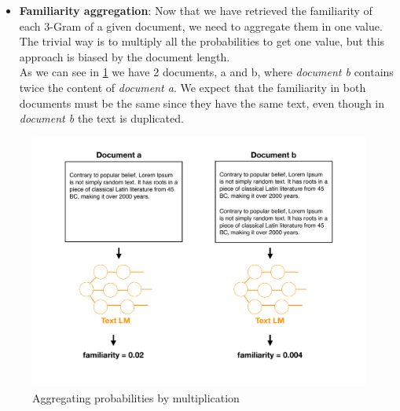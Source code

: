 \documentclass[12pt,mscthesis]{usiinfthesis}
\begin{document}
\begin{itemize}
	
		\item \textbf{Familiarity aggregation}: Now that we have retrieved the familiarity of each 3-Gram of a given document, we need to aggregate them in one value. The trivial way is to multiply all the probabilities to get one value, but this approach is biased by the document length.\\
		As we can see in \cref{aggregation-by-multiplication} we have 2 documents, a and b, where \emph{document b} contains twice the content of \emph{document a}. We expect that the familiarity in both documents must be the same since they have the same text, even though in \emph{document b} the text is duplicated.\\ 
			\end{itemize}
		\begin{figure}[H]
			\centering
			\includegraphics[width=\textwidth]{aggregation-by-multiplication}
			\caption{Aggregating probabilities by multiplication}
			\label{aggregation-by-multiplication}
			\end{figure}
\end{document}
